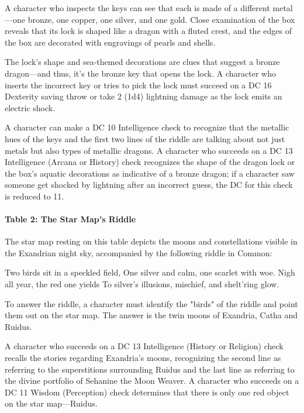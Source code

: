 \documentclass[10pt,a4paper,twoside,bg=print,twocolumn,openany,nodeprecatedcode]{dndbook}
\begin{document}
A character who inspects the keys can see that each is made of a different metal—one bronze, one copper, one silver, and one gold. Close examination of the box reveals that its lock is shaped like a dragon with a fluted crest, and the edges of the box are decorated with engravings of pearls and shells.

The lock's shape and sea-themed decorations are clues that suggest a bronze dragon—and thus, it's the bronze key that opens the lock. A character who inserts the incorrect key or tries to pick the lock must succeed on a DC 16 Dexterity saving throw or take 2 (1d4) lightning damage as the lock emits an electric shock.

A character can make a DC 10 Intelligence check to recognize that the metallic hues of the keys and the first two lines of the riddle are talking about not just metals but also types of metallic dragons. A character who succeeds on a DC 13 Intelligence (Arcana or History) check recognizes the shape of the dragon lock or the box's aquatic decorations as indicative of a bronze dragon; if a character saw someone get shocked by lightning after an incorrect guess, the DC for this check is reduced to 11.

\paragraph{Table 2: The Star Map's Riddle}
The star map resting on this table depicts the moons and constellations visible in the Exandrian night sky, accompanied by the following riddle in Common:

\begin{DndReadAloud}{}
Two birds sit in a speckled field, One silver and calm, one scarlet with woe. Nigh all year, the red one yields To silver's illusions, mischief, and shelt'ring glow.

\end{DndReadAloud}

To answer the riddle, a character must identify the "birds" of the riddle and point them out on the star map. The answer is the twin moons of Exandria, Catha and Ruidus.

A character who succeeds on a DC 13 Intelligence (History or Religion) check recalls the stories regarding Exandria's moons, recognizing the second line as referring to the superstitions surrounding Ruidus and the last line as referring to the divine portfolio of Sehanine the Moon Weaver. A character who succeeds on a DC 11 Wisdom (Perception) check determines that there is only one red object on the star map—Ruidus.
\end{document}
